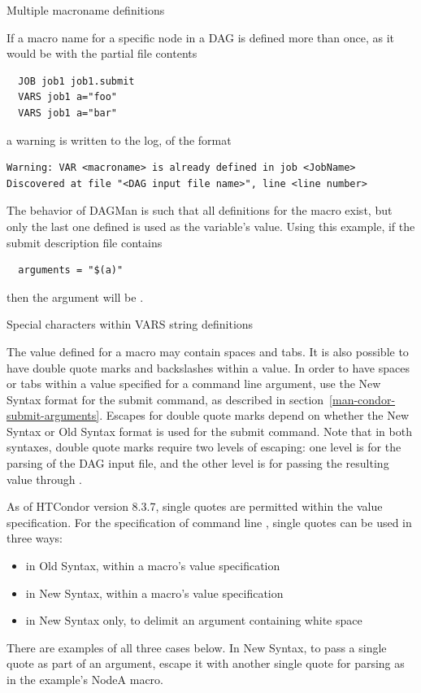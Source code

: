 \begin{description}
\item[Multiple macroname definitions]
\end{description}

If a macro name for a specific node in a DAG is defined more than once,
as it would be with the partial file contents
\begin{verbatim}
  JOB job1 job1.submit
  VARS job1 a="foo"
  VARS job1 a="bar"
\end{verbatim}
a warning is written to the log, of the format 
\begin{verbatim}
Warning: VAR <macroname> is already defined in job <JobName>
Discovered at file "<DAG input file name>", line <line number>
\end{verbatim}

The behavior of DAGMan is such that all definitions for the macro exist,
but only the last one defined is used as the variable's value.
Using this example, 
if the  submit description file contains
\begin{verbatim}
  arguments = "$(a)"
\end{verbatim}
then the argument will be .

\begin{description}
\item[Special characters within VARS string definitions]
\end{description}

The value defined for a macro may contain spaces and tabs.
It is also possible to have double quote marks and
backslashes within a value.
In order to have spaces or tabs within a value specified for a command line
argument,
use the New Syntax format for the  submit command,
as described in section~\ref{man-condor-submit-arguments}.
Escapes for double quote marks
depend on whether the New Syntax or Old Syntax format is used
for the  submit command.
Note that in both syntaxes,
double quote marks require two levels of escaping:
one level is for the parsing of the DAG input file, and the other level is for
passing the resulting value through .

As of HTCondor version 8.3.7, 
single quotes are permitted within the value specification.  
For the specification of command line , 
single quotes can be used in three ways:
\begin{itemize}
\item in Old Syntax, within a macro's value specification
\item in New Syntax, within a macro's value specification
\item in New Syntax only, to delimit an argument containing white space 
\end{itemize}
There are examples of all three cases below.  
In New Syntax, 
to pass a single quote as part of an argument, 
escape it with another single quote
for  parsing as in the example's NodeA  macro.

